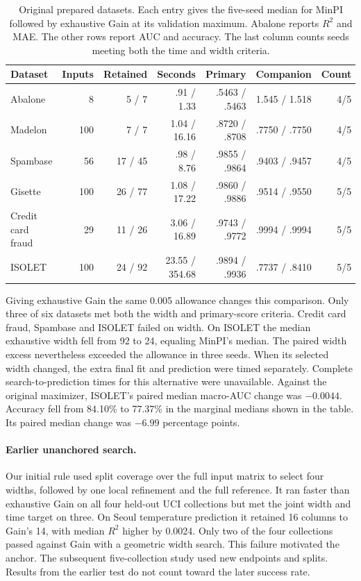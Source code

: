 \begin{table}[htbp]
\centering
\caption{Original prepared datasets. Each entry gives the five-seed median for MinPI followed by exhaustive Gain at its validation maximum. Abalone reports $R^2$ and MAE. The other rows report AUC and accuracy. The last column counts seeds meeting both the time and width criteria.}
\label{tab:original}
\small
\begin{tabular}{lrrrrrr}
\toprule
Dataset & Inputs & Retained & Seconds & Primary & Companion & Count\\
\midrule
Abalone & 8 & 5 / 7 & .91 / 1.33 & .5463 / .5463 & 1.545 / 1.518 & 4/5\\
Madelon & 100 & 7 / 7 & 1.04 / 16.16 & .8720 / .8708 & .7750 / .7750 & 4/5\\
Spambase & 56 & 17 / 45 & .98 / 8.76 & .9855 / .9864 & .9403 / .9457 & 4/5\\
Gisette & 100 & 26 / 77 & 1.08 / 17.22 & .9860 / .9886 & .9514 / .9550 & 5/5\\
Credit card fraud & 29 & 11 / 26 & 3.06 / 16.89 & .9743 / .9772 & .9994 / .9994 & 5/5\\
ISOLET & 100 & 24 / 92 & 23.55 / 354.68 & .9894 / .9936 & .7737 / .8410 & 5/5\\
\bottomrule
\end{tabular}
\end{table}

Giving exhaustive Gain the same 0.005 allowance changes this comparison. Only three of six datasets met both the width and primary-score criteria. Credit card fraud, Spambase and ISOLET failed on width. On ISOLET the median exhaustive width fell from 92 to 24, equaling MinPI's median. The paired width excess nevertheless exceeded the allowance in three seeds. When its selected width changed, the extra final fit and prediction were timed separately. Complete search-to-prediction times for this alternative were unavailable. Against the original maximizer, ISOLET's paired median macro-AUC change was $-0.0044$. Accuracy fell from 84.10\% to 77.37\% in the marginal medians shown in the table. Its paired median change was $-6.99$ percentage points.

\paragraph{Earlier unanchored search.}
Our initial rule used split coverage over the full input matrix to select four widths, followed by one local refinement and the full reference. It ran faster than exhaustive Gain on all four held-out UCI collections but met the joint width and time target on three. On Seoul temperature prediction it retained 16 columns to Gain's 14, with median $R^2$ higher by 0.0024. Only two of the four collections passed against Gain with a geometric width search. This failure motivated the anchor. The subsequent five-collection study used new endpoints and splits. Results from the earlier test do not count toward the later success rate.

